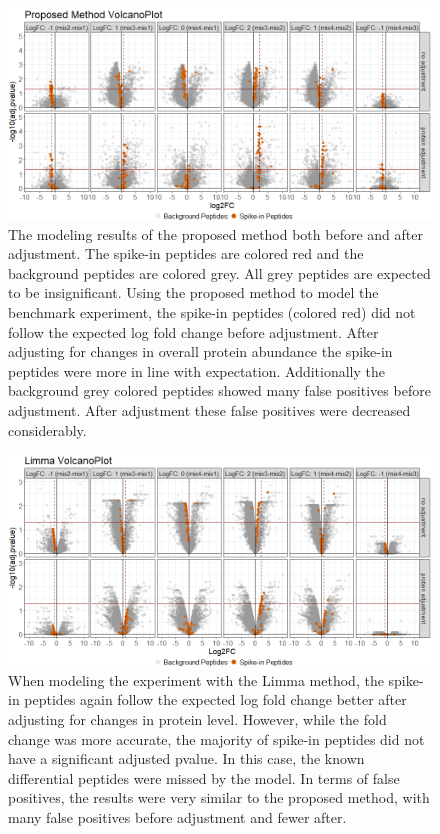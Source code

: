 \documentclass{mcp}
\begin{document}
\begin{figure}[h!]
\centering
\includegraphics[width=1\textwidth]{sim_new/spike_in_msstatsptm_volcano}
\caption{The modeling results of the proposed method both before and after adjustment. The spike-in peptides are colored red and the background peptides are colored grey. All grey peptides are expected to be insignificant. Using the proposed method to model the benchmark experiment, the spike-in peptides (colored red) did not follow the expected log fold change before adjustment. After adjusting for changes in overall protein abundance the spike-in peptides were more in line with expectation. Additionally the background grey colored peptides showed many false positives before adjustment. After adjustment these false positives were decreased considerably. \label{fig:spike_volcano_msstats}}
\end{figure}

\begin{figure}[h!]
\centering
\includegraphics[width=1\textwidth]{sim_new/spike_in_limma_volcano}
\caption{When modeling the experiment with the Limma method, the spike-in peptides again follow the expected log fold change better after adjusting for changes in protein level. However, while the fold change was more accurate, the majority of spike-in peptides did not have a significant adjusted pvalue. In this case, the known differential peptides were missed by the model. In terms of false positives, the results were very similar to the proposed method, with many false positives before adjustment and fewer after. \label{fig:spike_volcano_limma}}
\end{figure}
\end{document}
